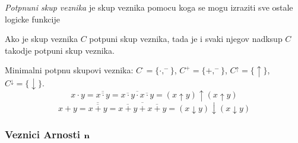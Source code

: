 \documentclass[12p, a4paper]{article}
\begin{document}
\begin{multicols}{2}
    \emph{Potpnuni skup veznika} je skup veznika pomocu koga se mogu izraziti
    sve ostale logicke funkcije

    Ako je skup veznika $C$ potpuni skup veznika, tada je i svaki njegov 
    nadksup $C$ takodje potpuni skup veznika.

    Minimalni potpnu skupovi veznika: $C^\cdot = \{\cdot, ^-\}$, 
    $C^+ = \{+, ^-\}$, $C^\uparrow = \{\uparrow\}$, 
    $C^\downarrow = \{\downarrow\}$.
    \[
        x \cdot y = 
        \overline{\overline{x \cdot y}} = 
        \overline{\overline{x \cdot y} \cdot \overline{x \cdot y}} =
        (x \uparrow y) \uparrow (x \uparrow y)
    \]
    \[
        x + y =
        \overline{\overline{x + y}} =
        \overline{\overline{x + y} + \overline{x + y}} =
        (x \downarrow y) \downarrow (x \downarrow y)
    \]

    
    \subsubsection{Veznici Arnosti $\bold{n}$}

\end{multicols}
\end{document}
